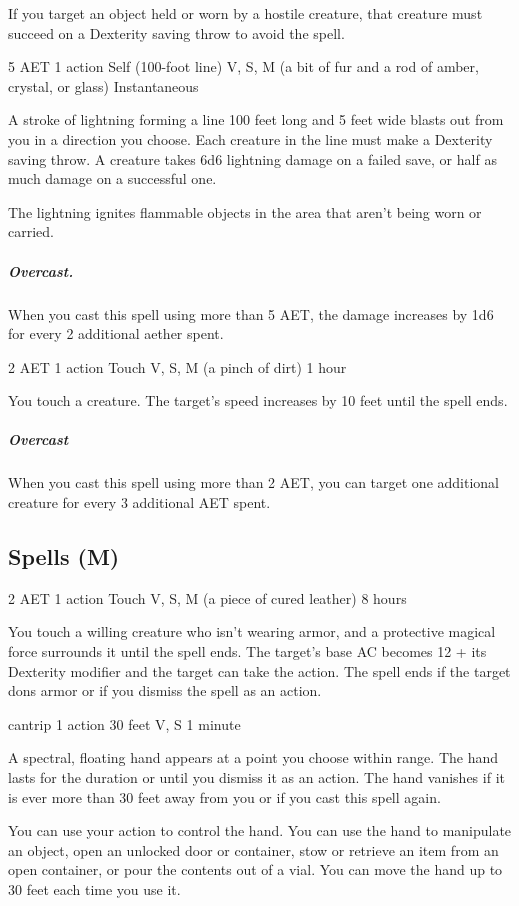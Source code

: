 If you target an object held or worn by a hostile creature, that creature must succeed on a Dexterity saving throw to avoid the spell.

\label{spell:lightning-bolt}
{5 AET}
{1 action}
{Self (100-foot line)}
{V, S, M (a bit of fur and a rod of amber, crystal, or glass)}
{Instantaneous}

A stroke of lightning forming a line 100 feet long and 5 feet wide blasts out from you in a direction you choose. Each creature in the line must make a Dexterity saving throw. A creature takes 6d6 lightning damage on a failed save, or half as much damage on a successful one.

The lightning ignites flammable objects in the area that aren't being worn or carried.
\subparagraph*{Overcast.}When you cast this spell using more than 5 AET, the damage increases by 1d6 for every 2 additional aether spent.

\label{spell:longstrider}
{2 AET}
{1 action}
{Touch}
{V, S, M (a pinch of dirt)}
{1 hour}

You touch a creature. The target's speed increases by 10 feet until the spell ends.
\subparagraph*{Overcast} When you cast this spell using more than 2 AET, you can target one additional creature for every 3 additional AET spent.

\subsection{Spells (M)}

\label{spell:mage-armor}
{2 AET}
{1 action}
{Touch}
{V, S, M (a piece of cured leather)}
{8 hours}

You touch a willing creature who isn't wearing armor, and a protective magical force surrounds it until the spell ends. The target's base AC becomes 12 + its Dexterity modifier and the target can take the  action. The spell ends if the target dons armor or if you dismiss the spell as an action.

\label{spell:mage-hand}
{cantrip}
{1 action}
{30 feet}
{V, S}
{1 minute}

A spectral, floating hand appears at a point you choose within range. The hand lasts for the duration or until you dismiss it as an action. The hand vanishes if it is ever more than 30 feet away from you or if you cast this spell again.

You can use your action to control the hand. You can use the hand to manipulate an object, open an unlocked door or container, stow or retrieve an item from an open container, or pour the contents out of a vial. You can move the hand up to 30 feet each time you use it.

